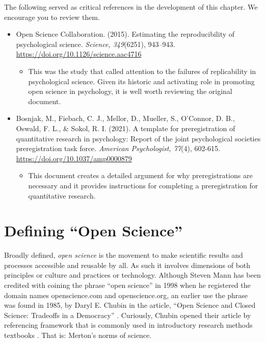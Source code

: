 \documentclass[
  11pt,
]{book}
\providecommand{\tightlist}{%
  \setlength{\itemsep}{0pt}\setlength{\parskip}{0pt}}
\begin{document}
The following served as critical references in the development of this chapter. We encourage you to review them.

\begin{itemize}
\tightlist
\item
  Open Science Collaboration. (2015). Estimating the reproducibility of psychological science. \emph{Science, 349}(6251), 943--943. \url{https://doi.org/10.1126/science.aac4716}

  \begin{itemize}
  \tightlist
  \item
    This was the study that called attention to the failures of replicability in psychological science. Given its historic and activating role in promoting open science in psychology, it is well worth reviewing the original document.
  \end{itemize}
\item
  Bosnjak, M., Fiebach, C. J., Mellor, D., Mueller, S., O'Connor, D. B., Oswald, F. L., \& Sokol, R. I. (2021). A template for preregistration of quantitative research in psychology: Report of the joint psychological societies preregistration task force. \emph{American Psychologist, 77}(4), 602-615. \url{https://doi.org/10.1037/amp0000879}

  \begin{itemize}
  \tightlist
  \item
    This document creates a detailed argument for why preregistrations are necessary and it provides instructions for completing a preregistration for quantitative research.
  \end{itemize}
\end{itemize}

\hypertarget{defining-open-science}{%
\section{Defining ``Open Science''}\label{defining-open-science}}

Broadly defined, \emph{open science} is the movement to make scientific results and processes accessible and reusable by all. As such it involves dimensions of both principles or culture and practices or technology. Although Steven Mann has been credited with coining the phrase ``open science'' in 1998 when he registered the domain names openscience.com and openscience.org, an earlier use the phrase was found in 1985, by Daryl E. Chubin in the article, ``Open Science and Closed Science: Tradeoffs in a Democracy'' \citep{noauthor_open_2022}. Curiously, Chubin opened their article by referencing framework that is commonly used in introductory research methods textbooks \citep[e.g.,][]{krathwohl_methods_2009}. That is: Merton's norms of science.
\end{document}
